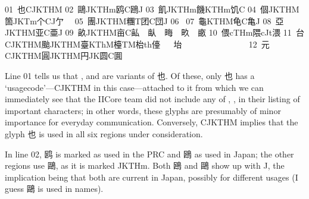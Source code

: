 \begin{multicols}{2}
\begingroup\mktsStyleCode{}01 {\cjk{}也}CJKTHM{} 
02 {\cjk{}鷗}JKTHm{\cjk{}{\cnsym{}　}鸥}C{\cjk{}{\cnsym{}　}鴎}J 
03 {\cjk{}飢}JKTHm{\cjk{}{\cnsym{}　}饑}KTHm{\cjk{}{\cnsym{}　}饥}C 
04 {\cjk{}個}JKTHM{\cjk{}{\cnsym{}　}箇}JKTm{\cjk{}{\cnsym{}　}个}CJ{\cjk{}{\cnsym{}　}亇{\cnsym{}　}} 
05 {\cjk{}團}JKTHM{\cjk{}{\cnsym{}　}糰}T{\cjk{}{\cnsym{}　}团}C{\cjk{}{\cnsym{}　}団}J{} 
06 {} 
07 {\cjk{}龜}KTHM{\cjk{}{\cnsym{}　}龟}C{\cjk{}{\cnsym{}　}亀}J{} 
{} 
08 {\cjk{}亞}JKTHM{\cjk{}{\cnsym{}　}亚}C{\cjk{}{\cnsym{}　}亜}J 
09 {\cjk{}畝}JKTHM{\cjk{}{\cnsym{}　}亩}C{\cjk{}{\cnsym{}　}畆{\cnsym{}　}畒{\cnsym{}　}畮{\cnsym{}　}畂{\cnsym{}　}畞} 
10 {\cjk{}偎}cTHm{\cjk{}{\cnsym{}　}隈}cJt{\cjk{}{\cnsym{}　}渨} 
11 {\cjk{}台}CJKTHM{\cjk{}{\cnsym{}　}颱}JKTHM{\cjk{}{\cnsym{}　}臺}KThM{\cjk{}{\cnsym{}　}檯}TM{\cjk{}{\cnsym{}　}枱}th{\cjk{}{\cnsym{}　}儓{\cnsym{}　}{\cnxb{}𡌫}} 
{坮{\cnsym{}　}{\cnxb{}𡋛}{\cnsym{}　}{\cnxb{}𡌬}{\cnsym{}　}{\cnxb{}𡎲}{\cnsym{}　}{\cnxb{}𡐉}{\cnsym{}　}{\cnxb{}𡔼}{\cnsym{}　}{\cnxb{}𦤼}} 
12 {\cjk{}元}CJKTHM{\cjk{}{\cnsym{}　}圓}JKTHM{\cjk{}{\cnsym{}　}円}JK{\cjk{}{\cnsym{}　}圆}C{\cjk{}{\cnsym{}　}圎} 
\endgroup{}{}

\endgroup{}Line {\mktsStyleCode{}01} tells us that {}, { }and { }are variants of {\cjk{}也}. Of
these, only {\cjk{}也} has a ‘usagecode’—{\mktsStyleCode{}CJKTHM} in this case—attached to it
from which we can immediately see that the IICore team did not
include any of {}, {}, { }in their listing of important characters;
in other words, these glyphs are presumably of minor importance
for everyday communication. Conversely, {\mktsStyleCode{}CJKTHM} implies that the glyph {\cjk{}也}
is used in all six regions under consideration.\mktsShowpar\par
In line {\mktsStyleCode{}02}, {\cjk{}鸥} is marked as used in the PRC and {\cjk{}鴎} as used in Japan;
the other regions use {\cjk{}鷗}, as it is marked {\mktsStyleCode{}JKTHm}. Both
{\cjk{}鴎} and {\cjk{}鷗} show up with {\mktsStyleCode{}J}, the implication being that both are
current in Japan, possibly for different usages (I guess {\cjk{}鷗} is used in names).\mktsShowpar\par
\end{multicols}
